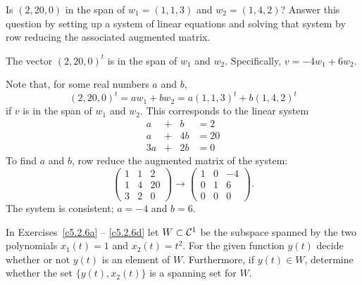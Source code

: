 \documentclass{ximera}
\begin{document}


\problemlabel

\begin{exercise} \label{c5.2.5}
Is $(2,20,0)$ in the span of $w_1=(1,1,3)$ and $w_2=(1,4,2)$?
Answer this question by setting up a system of linear equations
and solving that system by row reducing the associated augmented
matrix.

\begin{solution}

\ans The vector $(2,20,0)^t$ is in the span of $w_1$ and $w_2$. 
Specifically, $v = -4w_1 + 6w_2$.

\soln Note that, for some real numbers $a$ and $b$,
\[
(2,20,0)^t = aw_1 + bw_2 = a(1,1,3)^t + b(1,4,2)^t
\]
if $v$ is in the span of $w_1$ and $w_2$.
This corresponds to the linear system
\[
\begin{array}{rrrrr}
a & + & b & = 2 \\
a & + & 4b & = 20 \\
3a & + & 2b & = 0 \end{array}
\]
To find $a$ and $b$, row reduce the augmented matrix of the system:
\[
\left(\begin{array}{rr|r} 1 & 1 & 2 \\ 1 & 4 & 20 \\
3 & 2 & 0 \end{array}\right) \longrightarrow
\left(\begin{array}{rr|r} 1 & 0 & -4 \\ 0 & 1 & 6 \\
0 & 0 & 0 \end{array}\right).
\]
The system is consistent; $a = -4$ and $b = 6$.

\end{solution}
\end{exercise}




\problemlabel

\noindent In Exercises~\ref{c5.2.6a} -- \ref{c5.2.6d} let $W\subset{\cal C}^1$
be the subspace spanned by the two polynomials $x_1(t) = 1$ and
$x_2(t)=t^2$.  For the given function $y(t)$ decide whether or not $y(t)$
is an element of $W$.  Furthermore, if $y(t)\in W$, determine whether the set
$\{y(t),x_2(t)\}$ is a spanning set for $W$.
\end{document}
